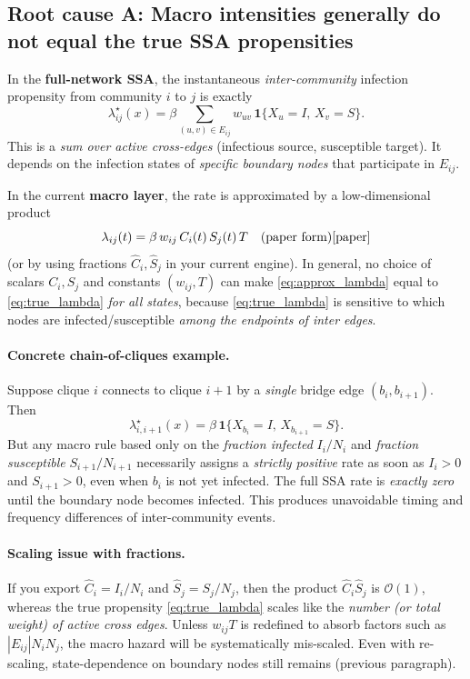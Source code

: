 \documentclass[11pt,a4paper]{article}
\begin{document}
\subsection{Root cause A: Macro intensities generally do not equal the true SSA propensities}

In the \textbf{full-network SSA}, the instantaneous \emph{inter-community} infection propensity from
community $i$ to $j$ is exactly
\begin{equation}
\label{eq:true_lambda}
\lambda^{\star}_{ij}(x)=\beta\sum_{(u,v)\in E_{ij}} w_{uv}\,\mathbf{1}\{X_u=I,\,X_v=S\}.
\end{equation}
This is a \emph{sum over active cross-edges} (infectious source, susceptible target). It depends on the
infection states of \emph{specific boundary nodes} that participate in $E_{ij}$.

In the current \textbf{macro layer}, the rate is approximated by a low-dimensional product
\begin{equation}
\label{eq:approx_lambda}
\lambda_{ij}(t)=\beta\,w_{ij}\,C_i(t)\,S_j(t)\,T
\quad\text{(paper form)}\cite{paper}
\end{equation}
(or by using fractions $\hat C_i,\hat S_j$ in your current engine).
In general, no choice of scalars $C_i,S_j$ and constants $(w_{ij},T)$ can make \eqref{eq:approx_lambda}
equal to \eqref{eq:true_lambda} \emph{for all states}, because \eqref{eq:true_lambda} is sensitive to which
nodes are infected/susceptible \emph{among the endpoints of inter edges}.

\paragraph{Concrete chain-of-cliques example.}
Suppose clique $i$ connects to clique $i{+}1$ by a \emph{single} bridge edge $(b_i,b_{i+1})$.
Then
\[
\lambda^{\star}_{i,i+1}(x)=\beta\,\mathbf{1}\{X_{b_i}=I,\,X_{b_{i+1}}=S\}.
\]
But any macro rule based only on the \emph{fraction infected} $I_i/N_i$ and \emph{fraction susceptible}
$S_{i+1}/N_{i+1}$ necessarily assigns a \emph{strictly positive} rate as soon as $I_i>0$ and $S_{i+1}>0$,
even when $b_i$ is not yet infected. The full SSA rate is \emph{exactly zero} until the boundary node
becomes infected. This produces unavoidable timing and frequency differences of inter-community events.

\paragraph{Scaling issue with fractions.}
If you export $\hat C_i=I_i/N_i$ and $\hat S_j=S_j/N_j$, then the product $\hat C_i\hat S_j$ is
$\mathcal{O}(1)$, whereas the true propensity \eqref{eq:true_lambda} scales like the \emph{number (or total weight)
of active cross edges}. Unless $w_{ij}T$ is redefined to absorb factors such as $|E_{ij}|N_iN_j$, the macro
hazard will be systematically mis-scaled. Even with re-scaling, state-dependence on boundary nodes
still remains (previous paragraph).
\end{document}
